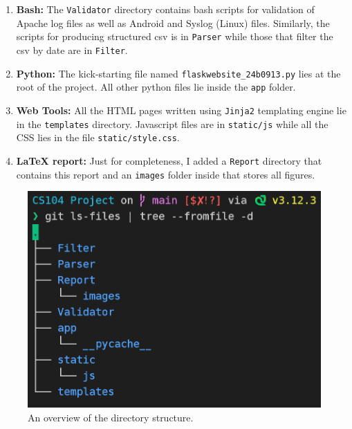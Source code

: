 \documentclass[11pt]{scrartcl}
\begin{document}
\begin{enumerate}
  \item \textbf{Bash:} The \texttt{Validator} directory contains bash scripts
    for validation of Apache log files as well as Android and Syslog (Linux)
    files. Similarly, the scripts for producing structured csv is in
    \texttt{Parser} while those that filter the csv by date are in
    \texttt{Filter}.

  \item \textbf{Python:} The kick-starting file named
    \texttt{flaskwebsite\_24b0913.py} lies at the root of the project. All other
    python files lie inside the \texttt{app} folder.

  \item \textbf{Web Tools:} All the HTML pages written using
    \texttt{Jinja2} templating engine lie in the \texttt{templates} directory.
    Javascript files are in \texttt{static/js} while all the CSS lies in the
    file \texttt{static/style.css}.

\item \textbf{{\LaTeX} report:} Just for completeness, I added a \texttt{Report}
    directory that contains this report and an \texttt{images} folder inside
    that stores all figures.
\end{enumerate}

\begin{figure}[htbp]

  \centering
  \includegraphics{images/directory.png}
  \caption{An overview of the directory structure.}
  \label{directory}

\end{figure}
\end{document}
